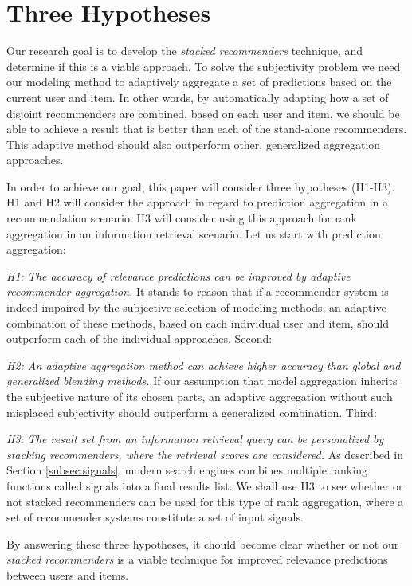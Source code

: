 \section{Three Hypotheses}
\label{sec:hypotheses}

Our research goal is to develop the \emph{stacked recommenders} technique, and determine if this is a viable approach.
To solve the subjectivity problem we need our modeling method
to adaptively aggregate a set of predictions based on the current user and item.
In other words, by automatically adapting how a set of disjoint recommenders
are combined, based on each user and item, we should be able to achieve a
result that is better than each of the stand-alone recommenders.
This adaptive method should also outperform other, generalized aggregation approaches.

In order to achieve our goal, this paper will consider three hypotheses (H1-H3).
H1 and H2 will consider the approach in regard to prediction aggregation
in a recommendation scenario. H3 will consider using this approach for
rank aggregation in an information retrieval scenario.
Let us start with prediction aggregation:

{
  \itshape
  H1: The accuracy of relevance predictions can be improved
  by adaptive recommender aggregation.
}
It stands to reason that if a recommender system is indeed impaired
by the subjective selection of modeling methods,
an adaptive combination of these methods, based on each individual user and item, 
should outperform each of the individual approaches.
Second:

{
  \itshape
  H2: An adaptive aggregation method can achieve higher accuracy than global and generalized blending methods.
}
If our assumption that model aggregation inherits the subjective nature of its chosen parts,
an adaptive aggregation without such misplaced subjectivity should outperform a
generalized combination.
Third:

{
  \itshape
  H3: The result set from an information retrieval query
  can be personalized by stacking recommenders, where the retrieval scores are considered.
}
As described in Section \ref{subsec:signals},
modern search engines combines multiple ranking functions called signals into a final results list.
We shall use H3 to see whether or not stacked recommenders can be used for this type of rank aggregation,
where a set of recommender systems constitute a set of input signals.

By answering these three hypotheses, it chould become clear whether or not
our \emph{stacked recommenders} is a viable technique for improved relevance predictions
between users and items.

